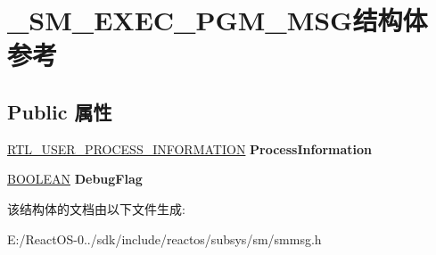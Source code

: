\hypertarget{struct___s_m___e_x_e_c___p_g_m___m_s_g}{}\section{\+\_\+\+S\+M\+\_\+\+E\+X\+E\+C\+\_\+\+P\+G\+M\+\_\+\+M\+S\+G结构体 参考}
\label{struct___s_m___e_x_e_c___p_g_m___m_s_g}
\subsection*{Public 属性}
\begin{DoxyCompactItemize}
\item 
\mbox{\label{struct___s_m___e_x_e_c___p_g_m___m_s_g_aa5aa66cb0aab2f5896407a3cdd320bfe}} 
\hyperlink{struct___r_t_l___u_s_e_r___p_r_o_c_e_s_s___i_n_f_o_r_m_a_t_i_o_n}{R\+T\+L\+\_\+\+U\+S\+E\+R\+\_\+\+P\+R\+O\+C\+E\+S\+S\+\_\+\+I\+N\+F\+O\+R\+M\+A\+T\+I\+ON} {\bfseries Process\+Information}
\item 
\mbox{\label{struct___s_m___e_x_e_c___p_g_m___m_s_g_a03b6930783f7fc2663d7b77e3ffb16fe}} 
\hyperlink{_processor_bind_8h_a112e3146cb38b6ee95e64d85842e380a}{B\+O\+O\+L\+E\+AN} {\bfseries Debug\+Flag}
\end{DoxyCompactItemize}


该结构体的文档由以下文件生成\+:\begin{DoxyCompactItemize}
\item 
E\+:/\+React\+O\+S-\/0../sdk/include/reactos/subsys/sm/smmsg.\+h\end{DoxyCompactItemize}
